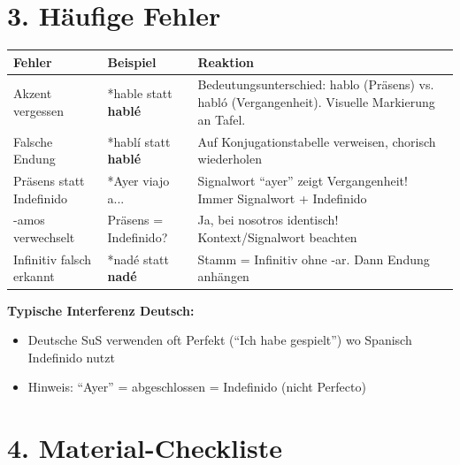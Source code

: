 \documentclass[11pt, a4paper]{article}
\newcommand{\fachfarbe}{spanisch}
\newcommand{\es}[1]{\textcolor{\fachfarbe}{\textbf{#1}}}
\begin{document}

\section*{3. Häufige Fehler}

\begin{fehlerbox}
\begin{tabularx}{\textwidth}{|l|X|X|}
\hline
\textbf{Fehler} & \textbf{Beispiel} & \textbf{Reaktion} \\
\hline
Akzent vergessen & *hable statt \es{hablé} & Bedeutungsunterschied: hablo (Präsens) vs. habló (Vergangenheit). Visuelle Markierung an Tafel. \\
\hline
Falsche Endung & *hablí statt \es{hablé} & Auf Konjugationstabelle verweisen, chorisch wiederholen \\
\hline
Präsens statt Indefinido & *Ayer viajo a... & Signalwort ``ayer'' zeigt Vergangenheit! Immer Signalwort + Indefinido \\
\hline
-amos verwechselt & Präsens = Indefinido? & Ja, bei nosotros identisch! Kontext/Signalwort beachten \\
\hline
Infinitiv falsch erkannt & *nadé statt \es{nadé} & Stamm = Infinitiv ohne -ar. Dann Endung anhängen \\
\hline
\end{tabularx}
\end{fehlerbox}

\textbf{Typische Interferenz Deutsch:}
\begin{itemize}
    \item Deutsche SuS verwenden oft Perfekt (``Ich habe gespielt'') wo Spanisch Indefinido nutzt
    \item Hinweis: ``Ayer'' = abgeschlossen = Indefinido (nicht Perfecto)
\end{itemize}


\section*{4. Material-Checkliste}
\end{document}
